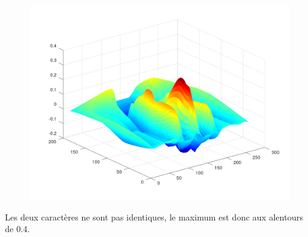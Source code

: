 \documentclass[a4paper,12pt,titlepage]{report}
\begin{document}
\begin{figure}[h]
\begin{center}
			\includegraphics[scale=0.25]{../illus/2cor.png}
		\end{center}
	\end{figure}

	Les deux caractères ne sont pas identiques, le maximum est donc aux alentours de 0.4.
	\\
	
\end{document}

